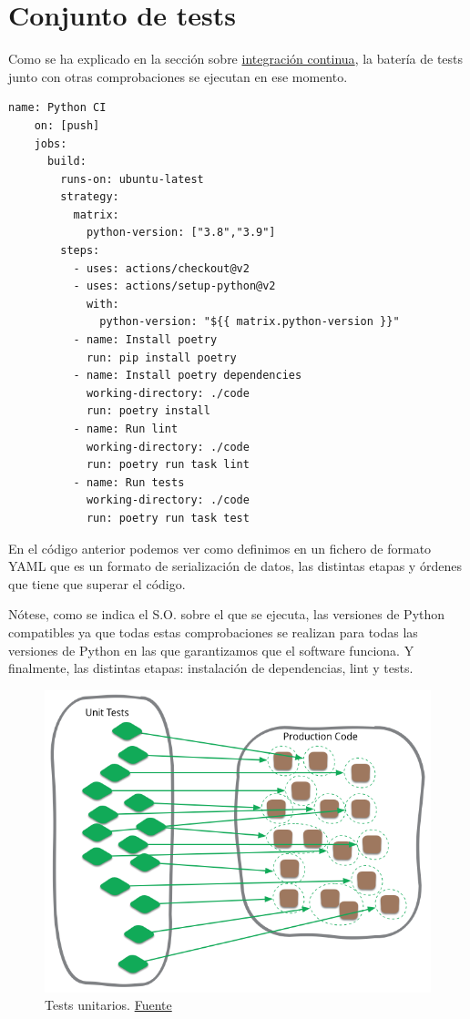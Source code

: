 \section{Conjunto de tests}
Como se ha explicado en la sección sobre \hyperref[sec:ci]{integración continua}, la
batería de tests junto con otras comprobaciones se ejecutan en ese momento.

\begin{lstlisting}[caption=Definición de las etapas de la CI del código del proyecto donde se puede apreciar que se especifican las versiones del lenguaje a comprobar. ]
    name: Python CI
    on: [push]
    jobs:
      build:
        runs-on: ubuntu-latest
        strategy:
          matrix:
            python-version: ["3.8","3.9"]
        steps:
          - uses: actions/checkout@v2
          - uses: actions/setup-python@v2
            with:
              python-version: "${{ matrix.python-version }}"
          - name: Install poetry
            run: pip install poetry
          - name: Install poetry dependencies
            working-directory: ./code
            run: poetry install
          - name: Run lint
            working-directory: ./code
            run: poetry run task lint
          - name: Run tests
            working-directory: ./code
            run: poetry run task test
\end{lstlisting}

En el código anterior podemos ver como definimos en un fichero de formato YAML que es un
formato de serialización de datos, las distintas etapas y órdenes que tiene que superar el
código.

Nótese, como se indica el S.O. sobre el que se ejecuta, las versiones de Python
compatibles ya que todas estas comprobaciones se realizan para todas las versiones de
Python en las que garantizamos que el software funciona. Y finalmente, las distintas
etapas: instalación de dependencias, lint y tests.

\FloatBarrier
\begin{figure}[h]
	\centering	
	\includegraphics[width=\textwidth]{doc/logos/imgs/unit-test.png}
    \caption{ Tests unitarios.
    \href{https://martinfowler.com/bliki/images/unitTest/sketch.png}{Fuente}}
    \label{fig:unit-tests}
\end{figure}
\FloatBarrier

